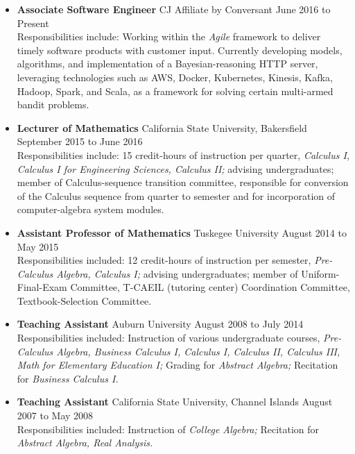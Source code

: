 \documentclass[11pt]{article}
\begin{document}
  \begin{itemize}
    \item{}
      {\bf Associate Software Engineer}
        \syltab CJ Affiliate by Conversant
        \syltab June 2016 to Present\\
      Responsibilities include:
        Working within the \emph{Agile} framework to deliver timely software
        products with customer input. Currently developing models, algorithms,
        and implementation of a Bayesian-reasoning HTTP server, leveraging
        technologies such as AWS, Docker, Kubernetes, Kinesis, Kafka, Hadoop,
        Spark, and Scala, as a framework for solving certain multi-armed bandit
        problems.
    \item{}
      {\bf Lecturer of Mathematics}
        \syltab California State University, Bakersfield
        \syltab September 2015 to June 2016\\
      Responsibilities include:
        15 credit-hours of instruction per quarter,
        {\em Calculus I, Calculus I for Engineering Sciences,
          Calculus II;}
        advising undergraduates;
        member of Calculus-sequence transition committee, responsible
        for conversion of the Calculus sequence from quarter to semester
        and for incorporation of computer-algebra system modules.
    \item{}
      {\bf Assistant Professor of Mathematics}
        \syltab Tuskegee University
        \syltab August 2014 to May 2015\\
      Responsibilities included:
        12 credit-hours of instruction per semester,
        {\em Pre-Calculus Algebra, Calculus I;}
        advising undergraduates;
        member of Uniform-Final-Exam Committee,
        T-CAEIL (tutoring center) Coordination Committee,
        Textbook-Selection Committee.
    \item{}
      {\bf Teaching Assistant}
        \syltab Auburn University
        \syltab August 2008 to July 2014\\
      Responsibilities included:
        Instruction of various undergraduate courses,
        {\em Pre-Calculus Algebra, Business Calculus I, Calculus I,
        Calculus II, Calculus III, Math for Elementary Education I;}
        Grading for \emph{Abstract Algebra;}
        Recitation for \emph{Business Calculus I.}
    \item{}
      {\bf Teaching Assistant}
        \syltab California State University, Channel Islands
        \syltab August 2007 to May 2008\\
      Responsibilities included:
        Instruction of {\em College Algebra;}
        Recitation for {\em Abstract Algebra, Real Analysis.}
  \end{itemize}
\end{document}
